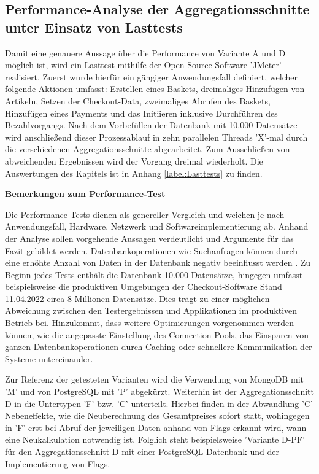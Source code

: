 \subsection{Performance-Analyse der Aggregationsschnitte unter Einsatz von Lasttests}

Damit eine genauere Aussage über die Performance von Variante A und D möglich ist, wird ein Lasttest mithilfe der Open-Source-Software 'JMeter' realisiert. Zuerst wurde hierfür ein gängiger Anwendungsfall definiert, welcher folgende Aktionen umfasst: Erstellen eines Baskets, dreimaliges Hinzufügen von Artikeln, Setzen der Checkout-Data, zweimaliges Abrufen des Baskets, Hinzufügen eines Payments und das Initiieren inklusive Durchführen des Bezahlvorgangs. Nach dem Vorbefüllen der Datenbank mit 10.000 Datensätze wird anschließend dieser Prozessablauf in zehn parallelen Threads 'X'-mal durch die verschiedenen Aggregationsschnitte abgearbeitet. Zum Ausschließen von abweichenden Ergebnissen wird der Vorgang dreimal wiederholt. Die Auswertungen des Kapitels ist in Anhang \ref{label:Lasttests} zu finden.

\textbf{Bemerkungen zum Performance-Test}

Die Performance-Tests dienen als genereller Vergleich und weichen je nach Anwendungsfall, Hardware, Netzwerk und Softwareimplementierung ab. Anhand der Analyse sollen vorgehende Aussagen verdeutlicht und Argumente für das Fazit gebildet werden. Datenbankoperationen wie Suchanfragen können durch eine erhöhte Anzahl von Daten in der Datenbank negativ beeinflusst werden . Zu Beginn jedes Tests enthält die Datenbank 10.000 Datensätze, hingegen umfasst beispielsweise die produktiven Umgebungen der Checkout-Software Stand 11.04.2022 circa 8 Millionen Datensätze. Dies trägt zu einer möglichen Abweichung zwischen den Testergebnissen und Applikationen im produktiven Betrieb bei. Hinzukommt, dass weitere Optimierungen vorgenommen werden können, wie die angepasste Einstellung des \Gls{Connection-Pool}s, das Einsparen von ganzen Datenbankoperationen durch Caching oder schnellere Kommunikation der Systeme untereinander. 

Zur Referenz der getesteten Varianten wird die Verwendung von MongoDB mit 'M' und von PostgreSQL mit 'P' abgekürzt. Weiterhin ist der Aggregationsschnitt D in die Untertypen 'F' bzw. 'C' unterteilt. Hierbei finden in der Abwandlung 'C' Nebeneffekte, wie die Neuberechnung des Gesamtpreises sofort statt, wohingegen in 'F' erst bei Abruf der jeweiligen Daten anhand von Flags erkannt wird, wann eine Neukalkulation notwendig ist. Folglich steht beispielsweise 'Variante D-PF' für den Aggregationsschnitt D mit einer PostgreSQL-Datenbank und der Implementierung von Flags.

